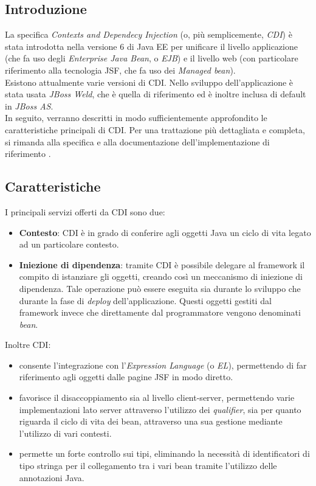 \subsection{Introduzione}

La specifica \textsl{Contexts and Dependecy Injection} (o, più semplicemente, \textsl{CDI}) è stata introdotta nella versione 6 di Java EE per unificare il livello applicazione (che fa uso degli \textsl{Enterprise Java Bean}, o \textsl{EJB}) e il livello web (con particolare riferimento alla tecnologia JSF, che fa uso dei \textsl{Managed bean}).\\
Esistono attualmente varie versioni di CDI. Nello sviluppo dell'applicazione è stata usata \textsl{JBoss Weld}, che è quella di riferimento ed è inoltre inclusa di default in \textsl{JBoss AS}.\\
In seguito, verranno descritti in modo sufficientemente approfondito le caratteristiche principali di CDI. Per una trattazione più dettagliata e completa, si rimanda alla specifica \cite{cdi} e alla documentazione dell'implementazione di riferimento \cite{weld}.

\subsection{Caratteristiche}

I principali servizi offerti da CDI sono due:

\begin{itemize}
\item \textbf{Contesto}: CDI è in grado di conferire agli oggetti Java un ciclo di vita legato ad un particolare contesto.
\item \textbf{Iniezione di dipendenza}: tramite CDI è possibile delegare al framework il compito di istanziare gli oggetti, creando così un meccanismo di iniezione di dipendenza. Tale operazione può essere eseguita sia durante lo sviluppo che durante la fase di \textit{deploy} dell'applicazione. Questi oggetti gestiti dal framework invece che direttamente dal programmatore vengono denominati \textsl{bean}.
\end{itemize}

Inoltre CDI:

\begin{itemize}
\item consente l'integrazione con l'\textsl{Expression Language} (o \textsl{EL}), permettendo di far riferimento agli oggetti dalle pagine JSF in modo diretto.
\item favorisce il disaccoppiamento sia al livello client-server, permettendo varie implementazioni lato server attraverso l'utilizzo dei \textit{qualifier}, sia per quanto riguarda il ciclo di vita dei bean, attraverso una sua gestione mediante l'utilizzo di vari contesti.
\item permette un forte controllo sui tipi, eliminando la necessità di identificatori di tipo stringa per il collegamento tra i vari bean tramite l'utilizzo delle annotazioni Java.
\end{itemize}

